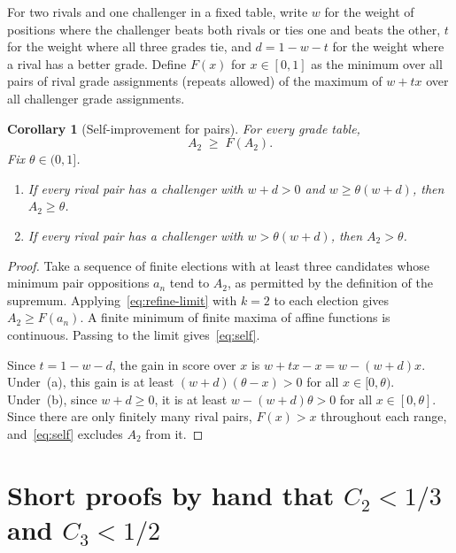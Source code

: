 \documentclass[11pt,letterpaper]{article}
\theoremstyle{cleanthm}
\newtheorem{corollary}[lemma]{Corollary}
\begin{document}
For two rivals and one challenger in a fixed table, write \(w\) for the weight of positions where
the challenger beats both rivals or ties one and beats the other, \(t\) for the weight where all
three grades tie, and \(d=1-w-t\) for the weight where a rival has a better grade. Define \(F(x)\)
for \(x\in[0,1]\) as the minimum over all pairs of rival grade assignments (repeats allowed) of
the maximum of \(w+tx\) over all challenger grade assignments.

\begin{corollary}[Self-improvement for pairs]\label{cor:self}
For every grade table,
\begin{equation}\label{eq:self}
 A_2 \;\ge\; F(A_2).
\end{equation}
Fix \(\theta\in(0,1]\).
\begin{enumerate}[label=\textup{(\alph*)}]
 \item If every rival pair has a challenger with \(w+d>0\) and \(w\ge \theta(w+d)\), then
   \(A_2\ge \theta\).
 \item If every rival pair has a challenger with \(w>\theta(w+d)\), then \(A_2>\theta\).
\end{enumerate}
\end{corollary}

\begin{proof}
Take a sequence of finite elections with at least three candidates whose minimum pair oppositions
\(a_n\) tend to \(A_2\), as permitted by the definition of the supremum.
Applying~\eqref{eq:refine-limit} with \(k=2\) to each election gives \(A_2\ge F(a_n)\). A finite
minimum of finite maxima of affine functions is continuous. Passing to the limit
gives~\eqref{eq:self}.

Since \(t=1-w-d\), the gain in score over \(x\) is \(w+tx-x=w-(w+d)x\). Under~(a), this gain is at
least \((w+d)(\theta-x)>0\) for all \(x\in[0,\theta)\). Under~(b), since \(w+d\ge 0\), it is at
least \(w-(w+d)\theta>0\) for all \(x\in[0,\theta]\). Since there are only finitely many rival
pairs, \(F(x)>x\) throughout each range, and~\eqref{eq:self} excludes \(A_2\) from it.
\end{proof}


\newpage
\section[Short proofs by hand]{Short proofs by hand that \texorpdfstring{\(C_2<1/3\)}{C2 < 1/3} and \texorpdfstring{\(C_3<1/2\)}{C3 < 1/2}}\label{sec:thresholds}
\end{document}
